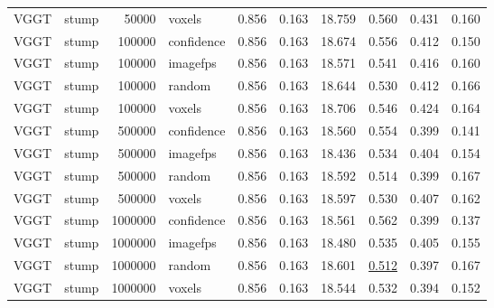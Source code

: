 \begin{table}[H]
\begin{tabular}{llrlrrrrrr}
VGGT & stump & 50000 & voxels & 0.856 & 0.163 & 18.759 & 0.560 & 0.431 & 0.160 \\
VGGT & stump & 100000 & confidence & 0.856 & 0.163 & 18.674 & 0.556 & 0.412 & 0.150 \\
VGGT & stump & 100000 & imagefps & 0.856 & 0.163 & 18.571 & 0.541 & 0.416 & 0.160 \\
VGGT & stump & 100000 & random & 0.856 & 0.163 & 18.644 & 0.530 & 0.412 & 0.166 \\
VGGT & stump & 100000 & voxels & 0.856 & 0.163 & 18.706 & 0.546 & 0.424 & 0.164 \\
VGGT & stump & 500000 & confidence & 0.856 & 0.163 & 18.560 & 0.554 & 0.399 & 0.141 \\
VGGT & stump & 500000 & imagefps & 0.856 & 0.163 & 18.436 & 0.534 & 0.404 & 0.154 \\
VGGT & stump & 500000 & random & 0.856 & 0.163 & 18.592 & 0.514 & 0.399 & 0.167 \\
VGGT & stump & 500000 & voxels & 0.856 & 0.163 & 18.597 & 0.530 & 0.407 & 0.162 \\
VGGT & stump & 1000000 & confidence & 0.856 & 0.163 & 18.561 & 0.562 & 0.399 & 0.137 \\
VGGT & stump & 1000000 & imagefps & 0.856 & 0.163 & 18.480 & 0.535 & 0.405 & 0.155 \\
VGGT & stump & 1000000 & random & 0.856 & 0.163 & 18.601 & \underline{0.512} & 0.397 & 0.167 \\
VGGT & stump & 1000000 & voxels & 0.856 & 0.163 & 18.544 & 0.532 & 0.394 & 0.152 \\
\bottomrule
\end{tabular}
\end{table}